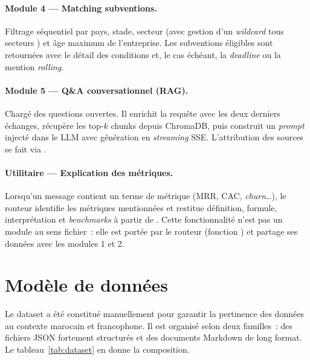 \paragraph{Module 4 --- Matching subventions.} Filtrage séquentiel par pays, stade, secteur (avec gestion d'un \textit{wildcard} \og tous secteurs \fg) et âge maximum de l'entreprise. Les subventions éligibles sont retournées avec le détail des conditions et, le cas échéant, la \textit{deadline} ou la mention \textit{rolling}.

\paragraph{Module 5 --- Q\&A conversationnel (\ac{RAG}).} Chargé des questions ouvertes. Il enrichit la requête avec les deux derniers échanges, récupère les top-$k$ chunks depuis ChromaDB, puis construit un \textit{prompt} injecté dans le \ac{LLM} avec génération en \textit{streaming} \ac{SSE}. L'attribution des sources se fait via .

\paragraph{Utilitaire --- Explication des métriques.} Lorsqu'un message contient un terme de métrique (\ac{MRR}, \ac{CAC}, \textit{churn}\ldots), le routeur identifie les métriques mentionnées et restitue définition, formule, interprétation et \textit{benchmarks} à partir de . Cette fonctionnalité n'est pas un module au sens fichier~: elle est portée par le routeur (fonction ) et partage ses données avec les modules 1 et 2.

\section{Modèle de données}

Le dataset a été constitué manuellement pour garantir la pertinence des données au contexte marocain et francophone. Il est organisé selon deux familles~: des fichiers \ac{JSON} fortement structurés et des documents Markdown de long format. Le tableau~\ref{tab:dataset} en donne la composition.

